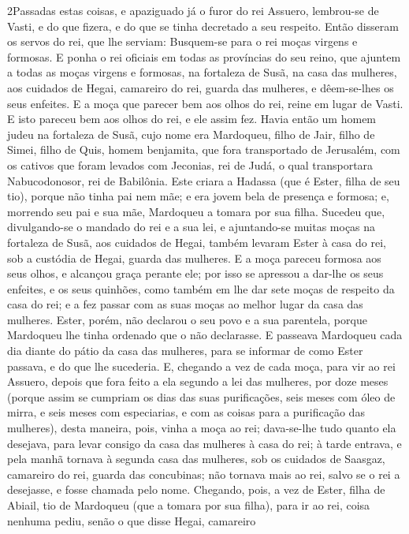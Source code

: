 \lettrine{2} Passadas estas coisas, e apaziguado já o furor do
rei Assuero, lembrou-se de Vasti, e do que fizera, e do que se tinha
decretado a seu respeito. Então disseram os servos do rei, que
lhe serviam: Busquem-se para o rei moças virgens e formosas. E
ponha o rei oficiais em todas as províncias do seu reino, que
ajuntem a todas as moças virgens e formosas, na fortaleza de Susã,
na casa das mulheres, aos cuidados de Hegai, camareiro do rei,
guarda das mulheres, e dêem-se-lhes os seus enfeites. E a moça
que parecer bem aos olhos do rei, reine em lugar de Vasti. E isto
pareceu bem aos olhos do rei, e ele assim fez. Havia então um
homem judeu na fortaleza de Susã, cujo nome era Mardoqueu, filho de
Jair, filho de Simei, filho de Quis, homem benjamita, que fora
transportado de Jerusalém, com os cativos que foram levados com
Jeconias, rei de Judá, o qual transportara Nabucodonosor, rei de
Babilônia. Este criara a Hadassa (que é Ester, filha de seu
tio), porque não tinha pai nem mãe; e era jovem bela de presença e
formosa; e, morrendo seu pai e sua mãe, Mardoqueu a tomara por sua
filha. Sucedeu que, divulgando-se o mandado do rei e a sua lei,
e ajuntando-se muitas moças na fortaleza de Susã, aos cuidados de
Hegai, também levaram Ester à casa do rei, sob a custódia de Hegai,
guarda das mulheres. E a moça pareceu formosa aos seus olhos, e
alcançou graça perante ele; por isso se apressou a dar-lhe os seus
enfeites, e os seus quinhões, como também em lhe dar sete moças de
respeito da casa do rei; e a fez passar com as suas moças ao melhor
lugar da casa das mulheres. Ester, porém, não declarou o seu
povo e a sua parentela, porque Mardoqueu lhe tinha ordenado que o
não declarasse. E passeava Mardoqueu cada dia diante do pátio
da casa das mulheres, para se informar de como Ester passava, e do
que lhe sucederia. E, chegando a vez de cada moça, para vir
ao rei Assuero, depois que fora feito a ela segundo a lei das
mulheres, por doze meses (porque assim se cumpriam os dias das suas
purificações, seis meses com óleo de mirra, e seis meses com
especiarias, e com as coisas para a purificação das mulheres),
desta maneira, pois, vinha a moça ao rei; dava-se-lhe tudo
quanto ela desejava, para levar consigo da casa das mulheres à casa
do rei; à tarde entrava, e pela manhã tornava à segunda casa
das mulheres, sob os cuidados de Saasgaz, camareiro do rei, guarda
das concubinas; não tornava mais ao rei, salvo se o rei a desejasse,
e fosse chamada pelo nome. Chegando, pois, a vez de Ester,
filha de Abiail, tio de Mardoqueu (que a tomara por sua filha), para
ir ao rei, coisa nenhuma pediu, senão o que disse Hegai, camareiro
